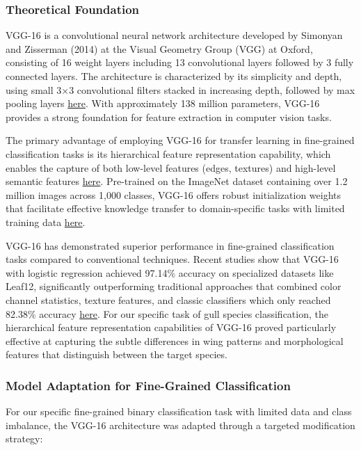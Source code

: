 \documentclass[a4paper,12pt]{article}
\begin{document}
\subsubsection{Theoretical Foundation}


VGG-16 is a convolutional neural network architecture developed by Simonyan and Zisserman (2014) at the Visual Geometry Group (VGG) at Oxford, consisting of 16 weight layers including 13 convolutional layers followed by 3 fully connected layers. The architecture is characterized by its simplicity and depth, using small 3×3 convolutional filters stacked in increasing depth, followed by max pooling layers \href{https://arxiv.org/abs/1409.1556}{here}. With approximately 138 million parameters, VGG-16 provides a strong foundation for feature extraction in computer vision tasks.

The primary advantage of employing VGG-16 for transfer learning in fine-grained classification tasks is its hierarchical feature representation capability, which enables the capture of both low-level features (edges, textures) and high-level semantic features \href{https://proceedings.neurips.cc/paper/2014/file/375c71349b295fbe2dcdca9206f20a06-Paper.pdf}{here}. Pre-trained on the ImageNet dataset containing over 1.2 million images across 1,000 classes, VGG-16 offers robust initialization weights that facilitate effective knowledge transfer to domain-specific tasks with limited training data \href{https://link.springer.com/article/10.1007/s11263-015-0816-y}{here}.

VGG-16 has demonstrated superior performance in fine-grained classification tasks compared to conventional techniques. Recent studies show that VGG-16 with logistic regression achieved 97.14\% accuracy on specialized datasets like Leaf12, significantly outperforming traditional approaches that combined color channel statistics, texture features, and classic classifiers which only reached 82.38\% accuracy \href{https://www.researchgate.net/publication/335846939_Bird_Species_Classification_from_an_Image_Using_VGG-16_Network}{here}. For our specific task of gull species classification, the hierarchical feature representation capabilities of VGG-16 proved particularly effective at capturing the subtle differences in wing patterns and morphological features that distinguish between the target species.

\subsubsection{Model Adaptation for Fine-Grained Classification}
For our specific fine-grained binary classification task with limited data and class imbalance, the VGG-16 architecture was adapted through a targeted modification strategy:
\end{document}
